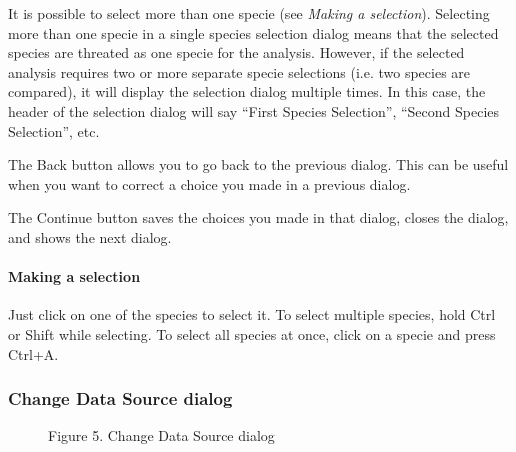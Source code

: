 \documentclass[letterpaper,10pt,english]{sphinxmanual}
\begin{document}
It is possible to select more than one specie (see \emph{Making a selection}).
Selecting more than one specie in a single species selection dialog
means that the selected species are threated as one specie for the
analysis. However, if the selected analysis requires two or more
separate specie selections (i.e. two species are compared), it will
display the selection dialog multiple times. In this case, the
header of the selection dialog will say ``First Species Selection'',
``Second Species Selection'', etc.

The Back button allows you to go back to the previous dialog. This can
be useful when you want to correct a choice you made in a previous
dialog.

The Continue button saves the choices you made in that dialog, closes
the dialog, and shows the next dialog.


\paragraph{Making a selection}
\label{user_manual:id2}
Just click on one of the species to select it. To select multiple
species, hold Ctrl or Shift while selecting. To select all species
at once, click on a specie and press Ctrl+A.


\subsubsection{Change Data Source dialog}
\label{user_manual:dialog-change-data-source}\label{user_manual:change-data-source-dialog}\begin{figure}[htbp]
\centering
\capstart

\caption{Figure 5. Change Data Source dialog}\end{figure}
\end{document}
